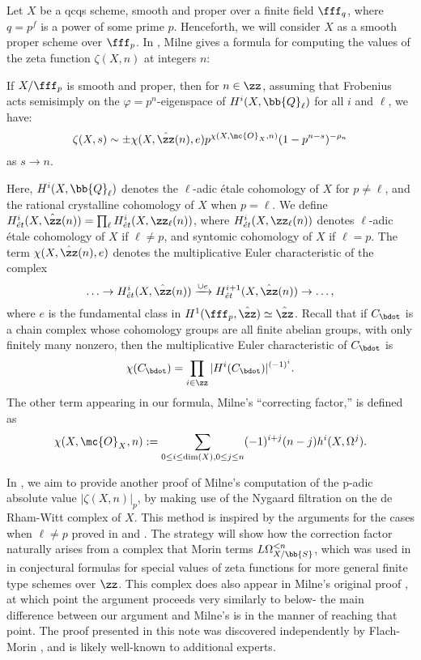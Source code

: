 		
\indent\indent Let $X$ be a qcqs scheme, smooth and proper over a finite field $\fff_q$, where $q=p^f$ is a power of some prime $p$.  Henceforth, we will consider $X$ as a smooth proper scheme over $\fff_p$.  In \cite{MilneValues}, Milne gives a formula for computing the values of the zeta function $\zeta(X,n)$ at integers $n$:
\begin{theorem}\label{Main1}
If $X/\fff_p$ is smooth and proper, then for $n\in\zz$, assuming that Frobenius acts semisimply on the $\varphi=p^n$-eigenspace of $H^i(X,\bb{Q}_{\ell})$ for all $i$ and $\ell$, we have:
$$\zeta(X,s)\sim \pm \chi(X,\hat{\zz}(n),e)p^{\chi(X,\mc{O}_X,n)}(1-p^{n-s})^{-\rho_{n}}$$
as $s\to n$.
\end{theorem}
\noindent Here, $H^i(X,\bb{Q}_{\ell})$ denotes the $\ell$-adic \'{e}tale cohomology of $X$ for $p\neq \ell$, and the rational crystalline cohomology of $X$ when $p=\ell$.  We define $H^i_{\acute{e}t}(X,\hat{\zz}(n))=\prod_{\ell}H^i_{\acute{e}t}(X,\zz_{\ell}(n))$, where $H^i_{\acute{e}t}(X,\zz_{\ell}(n))$ denotes $\ell$-adic \'{e}tale cohomology of $X$ if $\ell\neq p$, and syntomic cohomology of $X$ if $\ell=p$.  The term $\chi(X,\hat{\zz}(n),e)$ denotes the multiplicative Euler characteristic of the complex $$\ldots \to H^i_{\acute{e}t}(X,\hat{\zz}(n))\xrightarrow{\cup e} H^{i+1}_{\acute{e}t}(X,\hat{\zz}(n))\to\ldots,$$ where $e$ is the fundamental class in $H^1(\fff_p,\hat{\zz})\simeq \hat{\zz}$.  Recall that if $C_{\bdot}$ is a chain complex whose cohomology groups are all finite abelian groups, with only finitely many nonzero, then the multiplicative Euler characteristic of $C_{\bdot}$ is $$\chi(C_{\bdot})=\prod_{i\in\zz}|H^i(C_{\bdot})|^{(-1)^{i}}.$$   The other term appearing in our formula, Milne's ``correcting factor,'' is defined as $$\chi(X,\mc{O}_X,n):=\sum_{0\leq i\leq \dim(X), 0\leq j\leq n}(-1)^{i+j}(n-j)h^i(X,\Omega^j).$$

In , we aim to provide another proof of Milne's computation of the p-adic absolute value $|\zeta(X,n)|_{p}$, by making use of the Nygaard filtration on the de Rham-Witt complex of $X$. This method is inspired by the arguments for the cases when $\ell\neq p$ proved in \cite{Schneider1982} and \cite{Neukirch1978/79}.  The strategy will show how the correction factor naturally arises from a complex that Morin terms $L\Omega^{<n}_{X/\bb{S}}$, which was used in \cite{morin2021topological} in conjectural formulas for special values of zeta functions for more general finite type schemes over $\zz$.  This complex does also appear in Milne's original proof \cite[~]{MilneValues}, at which point the argument proceeds very similarly to below- the main difference between our argument and Milne's is in the manner of reaching that point.  The proof presented in this note was discovered independently by Flach-Morin \cite{Flach_Morin}, and is likely well-known to additional experts.

